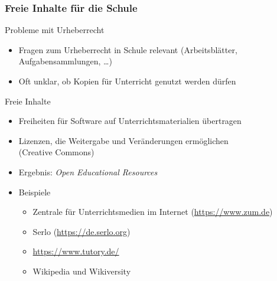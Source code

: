 \documentclass{beamer}
\begin{document}
\begin{frame}
  \frametitle{Freie Inhalte für die Schule}

  \onslide<+->

  \begin{block}{Probleme mit Urheberrecht}
    \begin{itemize}
    \item Fragen zum Urheberrecht in Schule relevant (Arbeitsblätter,
      Aufgabensammlungen, \dots)
    \item Oft unklar, ob Kopien für Unterricht genutzt werden dürfen
    \end{itemize}
  \end{block}

  \onslide<+->

  \begin{block}{Freie Inhalte}
    \begin{itemize}
    \item Freiheiten für Software auf Unterrichtsmaterialien übertragen
    \item Lizenzen, die Weitergabe und Veränderungen ermöglichen \\
      (Creative Commons)
    \item Ergebnis: \emph{Open Educational Resources}
    \item Beispiele
      \begin{itemize}
      \item Zentrale für Unterrichtsmedien im Internet
        (\url{https://www.zum.de})
      \item Serlo (\url{https://de.serlo.org})
      \item \url{https://www.tutory.de/}
      \item Wikipedia und Wikiversity
      \end{itemize}
    \end{itemize}
  \end{block}

\end{frame}
\end{document}
